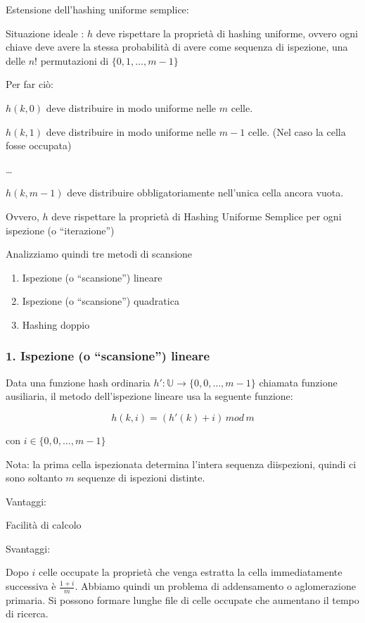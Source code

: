 \documentclass[tikz]{article}
\providecommand{\tightlist}{%
  \setlength{\itemsep}{0pt}\setlength{\parskip}{0pt}}
\begin{document}
{Estensione dell'hashing uniforme semplice: }

{Situazione ideale : }{$h$ deve rispettare la proprietà di }{hashing uniforme}{, ovvero ogni chiave deve avere la stessa probabilità di avere come sequenza di ispezione, una delle $n!$ permutazioni di $\{0,1,\ldots,m-1\}$}

{Per far ciò:}

{$h(k,0)$ deve distribuire in modo uniforme nelle $m$ celle.}

{$h(k,1)$ deve distribuire in modo uniforme nelle $m-1$ celle. (Nel caso la cella fosse occupata)}

{\ldots{}}

{$h(k,m-1)$ deve distribuire obbligatoriamente nell'unica cella ancora vuota.}

{Ovvero, $h$ deve rispettare la proprietà di Hashing Uniforme Semplice per ogni ispezione (o ``iterazione'') }

{Analizziamo quindi tre metodi di scansione}

\begin{enumerate}
\tightlist
\item
  {Ispezione (o ``scansione'') lineare}
\item
  {Ispezione (o ``scansione'') quadratica}
\item
  {Hashing doppio}
\end{enumerate}

\subsubsection{1. Ispezione (o ``scansione'') lineare}

{Data una funzione hash ordinaria $h':\mathbb{U} \rightarrow \{0,0,\ldots,m-1\}$ chiamata funzione ausiliaria, il metodo dell'ispezione lineare usa la seguente funzione:}

\begin{equation}
h(k,i) = (h'(k) + i)\,mod\,m
\end{equation}

{con $i \in \{0,0,\ldots,m-1\}$}

{Nota: la prima cella ispezionata determina l'intera sequenza diispezioni, quindi ci sono soltanto $m$ sequenze di ispezioni distinte.}

{Vantaggi: }

{Facilità di calcolo}

{Svantaggi}{: }

{Dopo $i$ celle occupate la proprietà che venga estratta la cella immediatamente successiva è $\frac{1+i}{m}$. Abbiamo quindi un problema di addensamento o aglomerazione primaria. Si possono formare lunghe file di celle occupate che aumentano il tempo di ricerca.}
\end{document}
